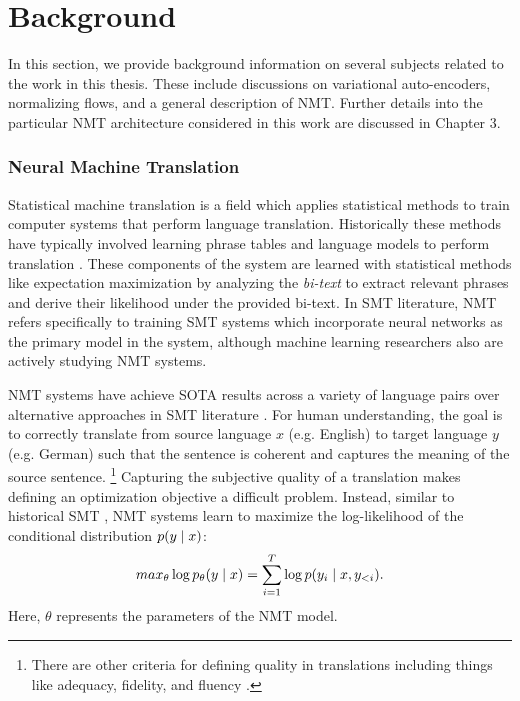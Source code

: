 \chapter{Background}

In this section, we provide background information on several subjects related to the work in this thesis. These include discussions on variational auto-encoders, normalizing flows, and a general description of \ac{NMT}. Further details into the particular \ac{NMT} architecture considered in this work are discussed in Chapter 3. %



\subsection{Neural Machine Translation}

Statistical machine translation is a field which applies statistical methods to train computer systems that perform language translation. Historically these methods have typically involved learning phrase tables and language models to perform translation \cite{koehnSMT2010}. These components of the system are learned with statistical methods like expectation maximization by analyzing the \textit{bi-text} to extract relevant phrases and derive their likelihood under the provided bi-text.  In \ac{SMT} literature, \ac{NMT} refers specifically to training \ac{SMT} systems which incorporate neural networks as the primary model in the system, although machine learning researchers also are actively studying \ac{NMT} systems. 

\ac{NMT} systems have achieve \ac{SOTA} results across a variety of language pairs over alternative approaches in \ac{SMT} literature \cite{bahdanau2014NMTBYJoint,koehn2017NMT,vaswani2017attentionTransformer}. For human understanding, the goal is to correctly translate from source language $x$ (e.g. English) to target language $y$ (e.g. German) such that the sentence is coherent and captures the meaning of the source sentence. \footnote{There are other criteria for defining quality in translations including things like adequacy, fidelity, and fluency \cite{Papineni2002BLEU}.} Capturing the subjective quality of a translation makes defining an optimization  objective a difficult problem. Instead, similar to historical \ac{SMT} , \ac{NMT} systems learn to maximize the log-likelihood of the conditional distribution $p(y\; | \;{x})$: 
\begin{equation}
	max_{\theta} \log p_{\theta}(y \; | \;{x})  = \sum_{i=1}^{T} \log p(y_{i} \; | \;{x, y_{<i}}).
\end{equation}
Here, $\theta$ represents the parameters of the \ac{NMT} model. 

